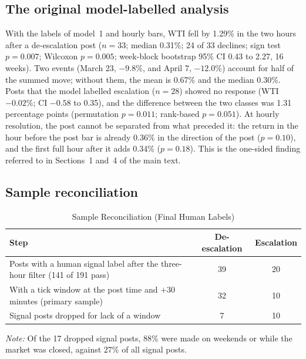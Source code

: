 \documentclass[11pt]{article}
\begin{document}
\subsection{The original model-labelled analysis}

With the labels of model~1 and hourly bars, WTI fell by 1.29\% in the two hours after a de-escalation post ($n = 33$; median 0.31\%; 24 of 33 declines; sign test $p = 0.007$; Wilcoxon $p = 0.005$; week-block bootstrap 95\% CI 0.43 to 2.27, 16 weeks). Two events (March 23, $-9.8$\%, and April 7, $-12.0$\%) account for half of the summed move; without them, the mean is 0.67\% and the median 0.30\%. Posts that the model labelled escalation ($n = 28$) showed no response (WTI $-0.02$\%; CI $-0.58$ to 0.35), and the difference between the two classes was 1.31 percentage points (permutation $p = 0.011$; rank-based $p = 0.051$). At hourly resolution, the post cannot be separated from what preceded it: the return in the hour before the post bar is already 0.36\% in the direction of the post ($p = 0.10$), and the first full hour after it adds 0.34\% ($p = 0.18$). This is the one-sided finding referred to in Sections~1 and~4 of the main text.

\subsection{Sample reconciliation}

\begin{table}[h]
\centering
\small
\caption{Sample Reconciliation (Final Human Labels)}
\label{tab:sample}
\begin{tabular}{lcc}
\toprule
Step & De-escalation & Escalation \\
\midrule
Posts with a human signal label after the three-hour filter (141 of 191 pass) & 39 & 20 \\
With a tick window at the post time and $+30$ minutes (primary sample) & 32 & 10 \\
Signal posts dropped for lack of a window & 7 & 10 \\
\bottomrule
\end{tabular}

\vspace{0.5em}
\begin{minipage}{0.9\textwidth}
\footnotesize\textit{Note:} Of the 17 dropped signal posts, 88\% were made on weekends or while the market was closed, against 27\% of all signal posts.
\end{minipage}
\end{table}
\end{document}
